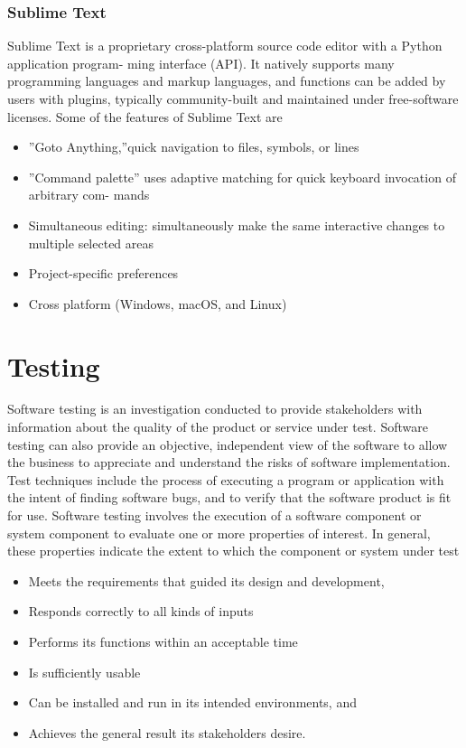 \documentclass[11pt]{report}
\begin{document}
\subsection{Sublime Text}
Sublime Text is a proprietary cross-platform source code editor with a Python application program-
ming interface (API). It natively supports many programming languages and markup languages,
and functions can be added by users with plugins, typically community-built and maintained under
free-software licenses.
Some of the features of Sublime Text are
\begin{itemize}
\item ”Goto Anything,”quick navigation to files, symbols, or lines
\item ”Command palette” uses adaptive matching for quick keyboard invocation of arbitrary com-
mands
\item Simultaneous editing: simultaneously make the same interactive changes to multiple selected
areas

\item Project-specific preferences

\item Cross platform (Windows, macOS, and Linux)

\end{itemize}

\chapter{Testing}
Software testing is an investigation conducted to provide stakeholders with information about
the quality of the product or service under test. Software testing can also provide an objective,
independent view of the software to allow the business to appreciate and understand the risks of
software implementation. Test techniques include the process of executing a program or application
with the intent of finding software bugs, and to verify that the software product is fit for use.
Software testing involves the execution of a software component or system component to evaluate
one or more properties of interest. In general, these properties indicate the extent to which the
component or system under test
\begin{itemize}
    \item Meets the requirements that guided its design and development,
    \item Responds correctly to all kinds of inputs
    \item Performs its functions within an acceptable time
\item Is sufficiently usable
\item Can be installed and run in its intended environments, and
\item Achieves the general result its stakeholders desire.
\end{itemize}
\end{document}
